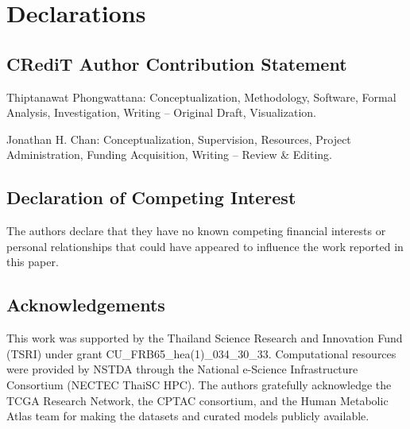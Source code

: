 \documentclass[12pt,a4paper]{article}
\begin{document}
\section*{Declarations}

\subsection*{CRediT Author Contribution Statement}

Thiptanawat Phongwattana: Conceptualization, Methodology, Software, Formal Analysis, Investigation, Writing -- Original Draft, Visualization.

Jonathan H. Chan: Conceptualization, Supervision, Resources, Project Administration, Funding Acquisition, Writing -- Review \& Editing.

\subsection*{Declaration of Competing Interest}

The authors declare that they have no known competing financial interests or personal relationships that could have appeared to influence the work reported in this paper.

\subsection*{Acknowledgements}

This work was supported by the Thailand Science Research and Innovation Fund (TSRI) under grant CU\_FRB65\_hea(1)\_034\_30\_33. Computational resources were provided by NSTDA through the National e-Science Infrastructure Consortium (NECTEC ThaiSC HPC). The authors gratefully acknowledge the TCGA Research Network, the CPTAC consortium, and the Human Metabolic Atlas team for making the datasets and curated models publicly available.
\end{document}
